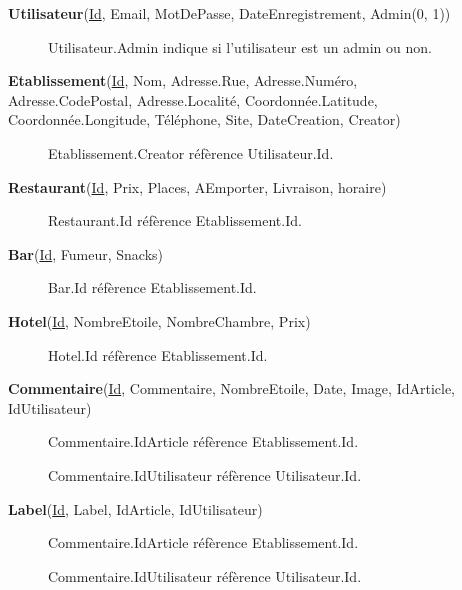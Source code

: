 \documentclass[a4paper,10pt]{article}
\begin{document}
\begin{description}
\item[] \textbf{Utilisateur}(\underline{Id}, Email, MotDePasse, DateEnregistrement, Admin(0, 1))
    \begin{description}
        \item[] Utilisateur.Admin indique si l'utilisateur est un admin ou non.
    \end{description}

\item[] \textbf{Etablissement}(\underline{Id}, Nom, Adresse.Rue,
    Adresse.Numéro, Adresse.CodePostal, Adresse.Localité, Coordonnée.Latitude,
    Coordonnée.Longitude, Téléphone, Site, DateCreation, Creator)
    \begin{description}
        \item[] Etablissement.Creator réfèrence Utilisateur.Id.
    \end{description}

\item[] \textbf{Restaurant}(\underline{Id}, Prix, Places, AEmporter, Livraison, horaire)
    \begin{description}
        \item[] Restaurant.Id réfèrence Etablissement.Id.
    \end{description}

\item[] \textbf{Bar}(\underline{Id}, Fumeur, Snacks)
    \begin{description}
        \item[] Bar.Id réfèrence Etablissement.Id.
    \end{description}

\item[] \textbf{Hotel}(\underline{Id}, NombreEtoile, NombreChambre, Prix)
    \begin{description}
        \item[] Hotel.Id réfèrence Etablissement.Id.
    \end{description}

\item[] \textbf{Commentaire}(\underline{Id}, Commentaire, NombreEtoile, Date,
    Image, IdArticle, IdUtilisateur)
    \begin{description}
        \item[] Commentaire.IdArticle réfèrence Etablissement.Id.
        \item[] Commentaire.IdUtilisateur réfèrence Utilisateur.Id.
    \end{description}

\item[] \textbf{Label}(\underline{Id}, Label, IdArticle, IdUtilisateur)
    \begin{description}
        \item[] Commentaire.IdArticle réfèrence Etablissement.Id.
        \item[] Commentaire.IdUtilisateur réfèrence Utilisateur.Id.
    \end{description}
\end{description}
\end{document}
